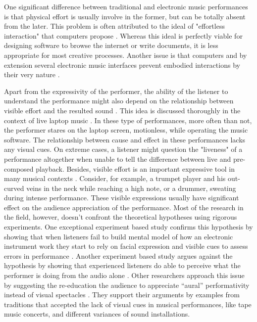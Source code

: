 \documentclass{sigchi}
\begin{document}
One significant difference between traditional and electronic music performances is that physical effort is usually involve in the former, but can be totally absent from the later.
This problem is often attributed to the ideal of "effortless interaction" that computers propose \cite{Ryan1992}.
Whereas this ideal is perfectly viable for designing software to browse the internet or write documents, it is less appropriate for most creative processes.
Another issue is that computers and by extension several electronic music interfaces prevent embodied interactions by their very nature \cite{Armstrong2006}.

Apart from the expressivity of the performer, the ability of the listener to understand the performance might also depend on the relationship between visible effort and the resulted sound \cite{Verdonk2015}.
This idea is discussed thoroughly in the context of live laptop music \cite{Schloss2003}.
In these type of performances, more often than not, the performer stares on the laptop screen, motionless, while operating the music software.
The relationship between cause and effect in these performances lacks any visual cues.
On extreme cases, a listener might question the "liveness" of a performance altogether when unable to tell the difference between live and pre-composed playback.
Besides, visible effort is an important expressive tool in many musical contexts \cite{Schloss2003}.
Consider, for example, a trumpet player and his out-curved veins in the neck while reaching a high note, or a drummer, sweating during intense performance.
These visible expressions usually have significant effect on the audience appreciation of the performance.
Most of the research in the field, however, doesn't confront the theoretical hypotheses using rigorous experiments.
One exceptional experiment based study confirms this hypothesis by showing that when listeners fail to build mental model of how an electronic instrument work they start to rely on facial expression and visible cues to assess errors in performance \cite{Fyans2010}.
Another experiment based study argues against the hypothesis by showing that experienced listeners do able to perceive what the performer is doing from the audio alone \cite{Bown2014}.
Other researchers approach this issue by suggesting the re-education the audience to appreciate ``aural'' performativity instead of visual spectacles \cite{Stuart2003}.
They support their arguments by examples from traditions that accepted the lack of visual cues in musical performances, like tape music concerts, and different variances of sound installations.
\end{document}
